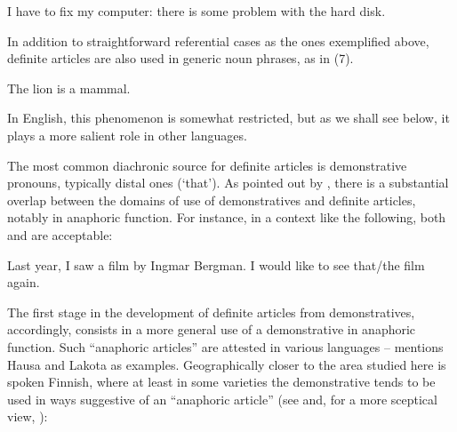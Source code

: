 
\ea
	\gl	\label{bkm:Ref75942712}I have to fix my computer: there is some problem with the hard disk. 
\z 

In addition to straightforward referential cases as the ones exemplified above, definite articles are also used in generic noun phrases, as in (7). 


\ea 
	\gl	\label{bkm:Ref123549675}The lion is a mammal.
\z 

In English, this phenomenon is somewhat restricted, but as we shall see below, it plays a more salient role in other languages.


The most common diachronic source for definite articles is demonstrative pronouns, typically distal ones (‘that’). As pointed out by \citet[332]{Lyons1999}, there is a substantial overlap between the domains of use of demonstratives and definite articles, notably in anaphoric function. For instance, in a context like the following, both  and  are acceptable:


\ea 
	\gl Last year, I saw a film by Ingmar Bergman. I would like to see that/the film again.
\z 

The first stage in the development of definite articles from demonstratives, accordingly, consists in a more general use of a demonstrative in anaphoric function. Such “anaphoric articles” are attested in various languages – \citet[53-54]{Lyons1999} mentions Hausa and Lakota as examples. Geographically closer to the area studied here is spoken Finnish, where at least in some varieties the demonstrative tends to be used in ways suggestive of an “anaphoric article” (see \citet{Laury1997} and, for a more sceptical view, \citet{Juvonen2000}):


